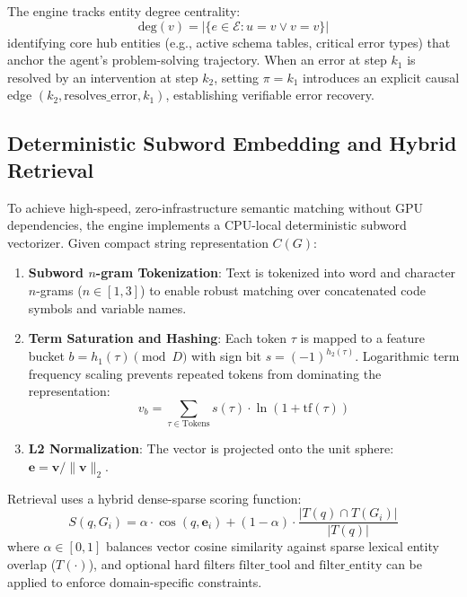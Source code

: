 \documentclass[lettersize,journal]{IEEEtran}
\begin{document}
The engine tracks entity degree centrality:
\begin{equation}
\label{eq:degree}
\text{deg}(v) = |\{e \in \mathcal{E} : u=v \vee v=v\}|
\end{equation}
identifying core hub entities (e.g., active schema tables, critical error types) that anchor the agent's problem-solving trajectory. When an error at step $k_1$ is resolved by an intervention at step $k_2$, setting $\pi = k_1$ introduces an explicit causal edge $(k_2, \text{resolves\_error}, k_1)$, establishing verifiable error recovery.

\subsection{Deterministic Subword Embedding and Hybrid Retrieval}

To achieve high-speed, zero-infrastructure semantic matching without GPU dependencies, the engine implements a CPU-local deterministic subword vectorizer. Given compact string representation $C(G)$:
\begin{enumerate}
    \item \textbf{Subword $n$-gram Tokenization}: Text is tokenized into word and character $n$-grams ($n \in [1, 3]$) to enable robust matching over concatenated code symbols and variable names.
    \item \textbf{Term Saturation and Hashing}: Each token $\tau$ is mapped to a feature bucket $b = h_1(\tau) \pmod D$ with sign bit $s = (-1)^{h_2(\tau)}$. Logarithmic term frequency scaling prevents repeated tokens from dominating the representation:
    \begin{equation}
    v_b = \sum_{\tau \in \text{Tokens}} s(\tau) \cdot \ln(1 + \text{tf}(\tau))
    \end{equation}
    \item \textbf{L2 Normalization}: The vector is projected onto the unit sphere: $\mathbf{e} = \mathbf{v} / \|\mathbf{v}\|_2$.
\end{enumerate}

Retrieval uses a hybrid dense-sparse scoring function:
\begin{equation}
\label{eq:hybrid_search}
S(q, G_i) = \alpha \cdot \cos(q, \mathbf{e}_i) + (1 - \alpha) \cdot \frac{|T(q) \cap T(G_i)|}{|T(q)|}
\end{equation}
where $\alpha \in [0, 1]$ balances vector cosine similarity against sparse lexical entity overlap ($T(\cdot)$), and optional hard filters $\text{filter\_tool}$ and $\text{filter\_entity}$ can be applied to enforce domain-specific constraints.
\end{document}
